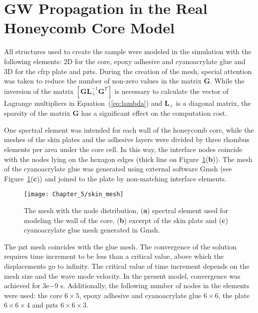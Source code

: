 \section{GW Propagation in the Real Honeycomb Core Model}
\label{sec:honeycomb}

All structures used to create the sample were modeled in the simulation with the following elements: 2D for the core, epoxy adhesive and cyanoacrylate glue and 3D for the \ac{cfrp} plate and \acp{pzt}.
During the creation of the mesh, special attention was taken to reduce the number of non-zero values in the matrix \(\textbf{G}\). While the inversion of the matrix \(\left [\textbf{GL}_+^{-1}\textbf{G}^T\right ]\) is necessary to calculate the vector of Lagrange multipliers in \mbox{Equation~(\ref{eq:lambda})} and \(\textbf{L}_+\) is a diagonal matrix, the sparsity of the matrix \(\textbf{G}\) has a significant effect on the computation cost.

One spectral element was intended for each wall of the honeycomb core, while the meshes of the skin plates and the adhesive layers were divided by three rhombus elements per area under the core cell.
In this way, the interface nodes coincide with the nodes lying on the hexagon edges (thick line on Figure~\ref{fig:skin_mesh}(\textbf{b})). %
The mesh of the cyanoacrylate glue was generated using external software Gmsh \cite{geuzaine2009gmsh} (see Figure~\ref{fig:skin_mesh}(\textbf{c})) and joined to the plate by non-matching interface elements.

\vspace{-6pt}
\begin{figure}[H]
	\texttt{[image: Chapter\_5/skin\_mesh]}
	\caption{The mesh with the node distribution, (\textbf{a}) spectral element used for modeling the wall of the core, (\textbf{b}) excerpt of the skin plate and (\textbf{c}) cyanoacrylate glue mesh generated in Gmsh.}
	\label{fig:skin_mesh}
\end{figure}

The \ac{pzt} mesh coincides with the glue mesh.
The convergence of the solution requires time increment to be less than a critical value, above which the displacements go to infinity.
The critical value of time increment depends on the mesh size and the wave mode velocity.
In the present model, convergence was achieved for 3e{$-$9} s.
Additionally, the following number of nodes in the elements were used: the core \(6 \times 5\), epoxy adhesive and cyanoacrylate glue \(6 \times 6\), the plate \(6 \times 6 \times 4\) and \acp{pzt} \(6 \times 6 \times 3\).